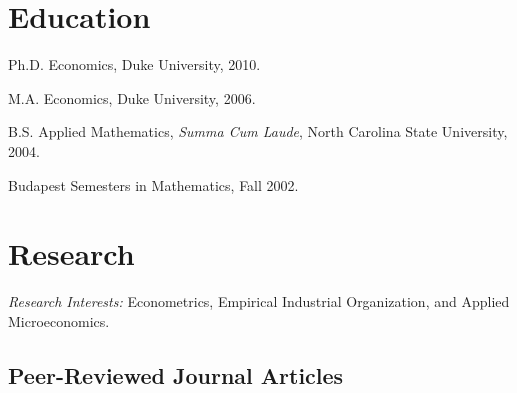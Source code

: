 \documentclass[10pt,letterpaper]{article}
\renewenvironment{itemize}{
  \begin{list}{}{
    \setlength{\leftmargin}{1.5em}
    \setlength{\itemsep}{0.25em}
    \setlength{\parskip}{0pt}
    \setlength{\parsep}{0.25em}
  }
}{
  \end{list}
}
\begin{document}
\section*{Education}

\begin{itemize}
  \item Ph.D. Economics, Duke University, 2010.
  \item M.A. Economics, Duke University, 2006.
  \item B.S. Applied Mathematics, \textit{Summa Cum Laude},
    North Carolina State University, 2004.
  \item Budapest Semesters in Mathematics, Fall 2002.
\end{itemize}

\section*{Research}

\textit{Research Interests:} Econometrics, Empirical Industrial Organization, and Applied Microeconomics.

\subsection*{Peer-Reviewed Journal Articles}
\end{document}

